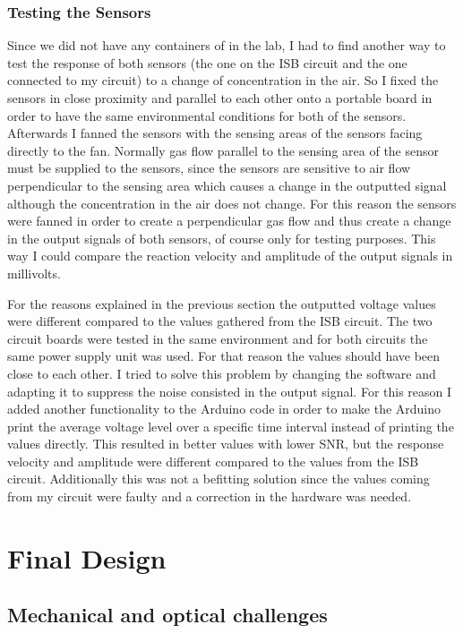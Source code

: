 \subsubsection{Testing the Sensors}
Since we did not have any containers of  in the lab, I had to find another way to test the response of both sensors (the one on the ISB circuit and the one connected to my circuit) to a change of  concentration in the air. So I fixed the sensors in close proximity and parallel to each other onto a portable board in order to have the same environmental conditions for both of the sensors. Afterwards I fanned the sensors with the sensing areas of the sensors facing directly to the fan. Normally gas flow parallel to the sensing area of the sensor must be supplied to the sensors, since the sensors are sensitive to air flow perpendicular to the sensing area which causes a change in the outputted signal although the  concentration in the air does not change. For this reason the sensors were fanned in order to create a perpendicular gas flow and thus create a change in the output signals of both sensors, of course only for testing purposes. This way I could compare the reaction velocity and amplitude of the output signals in millivolts.\par 
For the reasons explained in the previous section the outputted voltage values were different compared to the values gathered from the ISB circuit. The two circuit boards were tested in the same environment and for both circuits the same power supply unit was used. For that reason the values should have been close to each other. I tried to solve this problem by changing the software and adapting it to suppress the noise consisted in the output signal. For this reason I added another functionality to the Arduino code in order to make the Arduino print the average voltage level over a specific time interval instead of printing the values directly. This resulted in better values with lower SNR, but the response velocity and amplitude were different compared to the values from the ISB circuit. Additionally this was not a befitting solution since the values coming from my circuit were faulty and a correction in the hardware was needed.  

             

\section{Final Design}
\subsection{Mechanical and optical challenges}



